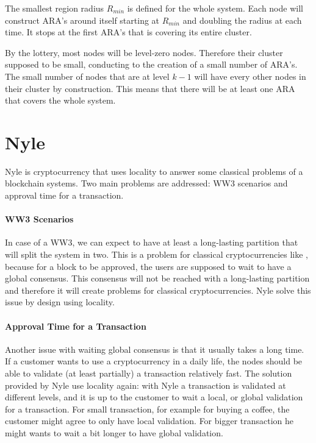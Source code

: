 \documentclass[a4paper,11pt,oneside]{report}
\begin{document}
The smallest region radius $R_{min}$ is defined for the whole system. Each node
will construct ARA's around itself starting at $R_{min}$ and doubling the
radius at each time. It stops at the first ARA's that is covering its entire
cluster. 

By the lottery, most nodes will be level-zero nodes. Therefore their cluster
supposed to be small, conducting to the creation of a small number of ARA's.
The small number of nodes that are at level $k-1$ will have every other nodes
in their cluster by construction. This means that there will be at least one
ARA that covers the whole system. 

\section{Nyle}

Nyle is cryptocurrency that uses locality to answer some classical problems of
a blockchain systems. Two main problems are addressed: WW3 scenarios and
approval time for a transaction.
 
\paragraph{WW3 Scenarios} \label{WW3} In case of a WW3, we can expect to have
at least a long-lasting partition that will split the system in two. This is a
problem for classical cryptocurrencies like \cite{bitcoin-paper}, because for a
block to be approved, the users are supposed to wait to have a global
consensus. This consensus will not be reached with a long-lasting partition and
therefore it will create problems for classical cryptocurrencies. Nyle solve
this issue by design using locality.

\paragraph{Approval Time for a Transaction} \label{approve_time} Another issue
with waiting global consensus is that it usually takes a long time. If a
customer wants to use a cryptocurrency in a daily life, the nodes should be 
able to validate (at least partially) a transaction relatively fast. The
solution provided by Nyle use locality again: with Nyle a transaction is
validated at different levels, and it is up to the customer to wait a local, or
global validation for a transaction. For small transaction, for example for
buying a coffee, the customer might agree to only have local validation. For
bigger transaction he might wants to wait a bit longer to have global
validation.
\end{document}
